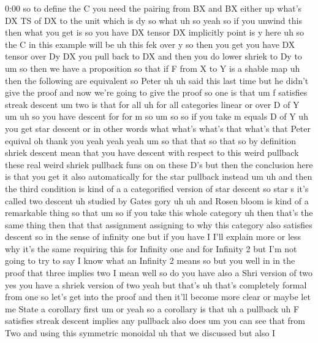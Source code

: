 \begin{unfinished}{0:00}
so  to  define  the  C  you  need  the  pairing
from  BX  and
BX  either  up
what's  DX  TS  of  DX  to  the  unit  which  is
dy  so  what  uh  so  yeah  so  if  you  unwind
this  then  what  you  get  is  so  you  have  DX
tensor  DX  implicitly  point  is  y  here  uh
so  the  C  in  this  example  will  be  uh  this
fek  over  y  so  then  you  get  you  have  DX
tensor  over  Dy  DX  you  pull  back  to  DX
and  then  you  do  lower  shriek  to
Dy
to
um  so  then  we  have  a
proposition  so  that  if  F  from  X  to  Y  is
a  shable  map
uh  then  the  following  are  equivalent  so
Peter  uh  uh  said  this  last  time  but  he
didn't  give  the  proof  and  now  we're
going  to  give  the  proof  so  one  is  that
um  f  satisfies  streak
descent  um  two  is  that  for  all
uh  for  all  categories  linear  or  over
D  of  Y
um  uh  so  you  have  descent  for  for  m
so  um
so
so  if  you  take  m  equals  D  of  Y  uh  you
get  star
descent  or  in  other
words  what  what's  what's  that  what's
that
Peter  equival  oh  thank  you  yeah  yeah
yeah  um  so  that  that  so  that  so  by
definition  shriek  descent  mean  that  you
have  descent  with  respect  to  this  weird
pullback  these  real  weird  shriek
pullback  funs  on  on  these  D's  but  then
the  conclusion  here  is  that  you  get  it
also  automatically  for  the  star  pullback
instead
um
uh  and  then  the  third  condition  is  kind
of  a  a  categorified  version  of  star
descent  so  star  s  it's  called  two
descent  uh  studied  by  Gates  gory
uh  uh  and  Rosen
bloom  is  kind  of  a  remarkable  thing  so
that
um
so  if  you  take  this  whole  category  uh
then  that's  the  same  thing  then  that
that  assignment  assigning  to  why  this
category  also  satisfies  descent
so
in  the  sense  of  infinity  one  but  if  you
have  I  I'll  explain  more  or  less  why
it's  the  same  requiring  this  for
Infinity  one  and  for  Infinity  2  but  I'm
not  going  to  try  to  say  I  know  what  an
Infinity  2  means  so  but  you  well  in  in
the  proof  that  three  implies  two  I  mean
well
so  do  you  have  also  a  Shri  version  of
two  yes  you  have  a  shriek  version  of  two
yeah  but  that's  uh  that's  completely
formal  from  one  so  let's  get  into  the
proof  and  then  it'll  become  more
clear
or  maybe  let  me  State  a  corollary  first
um  or
yeah  so  a  corollary  is  that
uh  a
pullback  uh  F  satisfies  streak
descent  implies  any
pullback  also
does
um  you  can  see  that  from  Two  and  using
this  symmetric
monoidal  uh  that  we  discussed  but  also  I

\end{unfinished}
